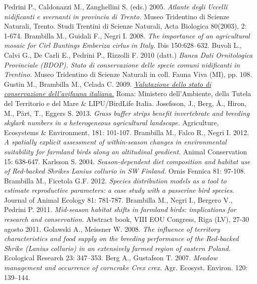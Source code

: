 \documentclass[10pt,twoside,openany,x11names,svgnames,italian,a5paper,dvipsnames,table]{memoir}
\begin{document}
\begin{thebibliography}{99}
Pedrini P., Caldonazzi M., Zanghellini S. (eds.) 2005. \emph{Atlante degli Uccelli nidificanti e svernanti in provincia di Trento.} Museo Tridentino di Scienze Naturali, Trento. Studi Trentini di Scienze Naturali, Acta Biologica 80(2003), 2: 1-674.
Brambilla M., Guidali F., Negri I. 2008. \emph{The importance of an agricultural mosaic for Cirl Buntings \emph{Emberiza cirlus} in Italy.} Ibis 150:628–632.
Buvoli L., Calvi G., De Carli E., Pedrini P., Rizzolli F. 2010 (datt.) \emph{Banca Dati Ornitologica Provinciale (BDOP). Stato di conservazione delle specie comuni nidificanti in Trentino.} Museo Tridentino di Scienze Naturali in coll. Fauna Viva (MI), pp. 108. 
Gustin M., Brambilla M., Celada C. 2009. \href{http://www.uccellidaproteggere.it/content/download/4210/46448/file/valutazione_avifauna_italiana_volumeI.pdf}{\emph{Valutazione dello stato di conservazione dell’avifauna italiana.}} Roma: Ministero dell’Ambiente, della Tutela del Territorio e del Mare \& LIPU/BirdLife Italia. 
Josefsson, J., Berg, Å., Hiron, M., Pärt, T., Eggers S. 2013. \emph{Grass buffer strips benefit invertebrate and breeding skylark numbers in a heterogeneous agricultural landscape.} Agriculture, Ecosystems \& Environment, 181: 101-107.
Brambilla M., Falco R., Negri I. 2012. \emph{A spatially explicit assessment of within-season changes in environmental suitability for farmland birds along an altitudinal gradient.} Animal Conservation 15: 638-647.
Karlsson S. 2004. \emph{Season-dependent diet composition and habitat use of Red-backed Shrikes \emph{Lanius collurio} in SW Finland.} Ornis Fennica 81: 97-108.
Brambilla M., Ficetola G.F. 2012. \emph{Species distribution models as a tool to estimate reproductive parameters: a case study with a passerine bird species.} Journal of Animal Ecology 81: 781-787.
Brambilla M., Negri I., Bergero V., Pedrini P. 2011. \emph{Mid-season habitat shifts in farmland birds: implications for research and conservation.} Abstract book, VIII EOU Congress, Riga (LV), 27-30 agosto 2011.
Golawski A., Meissner W. 2008. \emph{The influence of territory characteristics and food supply on the breeding performance of the Red-backed Shrike (\emph{Lanius collurio}) in an extensively farmed region of eastern Poland.} Ecological Research 23: 347–353.
Berg A., Gustafson T. 2007. \emph{Meadow management and occurrence of corncrake \emph{Crex crex.}} Agr. Ecosyst. Environ. 120: 139–144.

\end{thebibliography}
\end{document}
